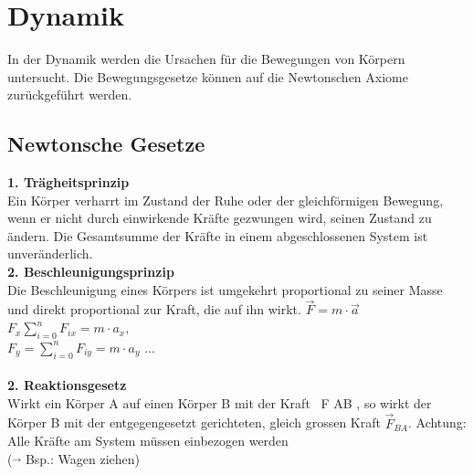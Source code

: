 \newpage
\section{Dynamik}
In der Dynamik werden die Ursachen für die Bewegungen von Körpern untersucht. Die Bewegungsgesetze können auf die Newtonschen Axiome zurückgeführt werden. 
\subsection{Newtonsche Gesetze}
\begin{multicols}{3}
\textbf{1. Trägheitsprinzip} \\
Ein Körper verharrt im Zustand der Ruhe oder der gleichförmigen Bewegung, wenn er
nicht durch einwirkende Kräfte gezwungen wird, seinen Zustand zu ändern. Die Gesamtsumme der Kräfte in einem abgeschlossenen System ist unveränderlich. 
\columnbreak
\\
\textbf{2. Beschleunigungsprinzip} \\
Die Beschleunigung eines Körpers ist umgekehrt proportional zu seiner Masse und direkt
proportional zur Kraft, die auf ihn wirkt. 
$\overrightarrow{F} = m \cdot \overrightarrow{a}$ \\
$F _x\sum\limits_{i=0}^{n} F_{ix} = m \cdot a_x,$ \\
$F_y = \sum\limits_{i=0}^{n} F_{iy} = m \cdot a_y$ ... \\
\columnbreak
\\
\textbf{2. Reaktionsgesetz } \\
Wirkt ein Körper A auf einen Körper B mit der Kraft ~F AB , so wirkt der Körper B mit der
entgegengesetzt gerichteten, gleich grossen Kraft $\overrightarrow{F}_{BA}$.
Achtung: Alle Kräfte am System müssen einbezogen werden \\
 ($\overrightarrow{}$ Bsp.: Wagen ziehen)
\end{multicols}

